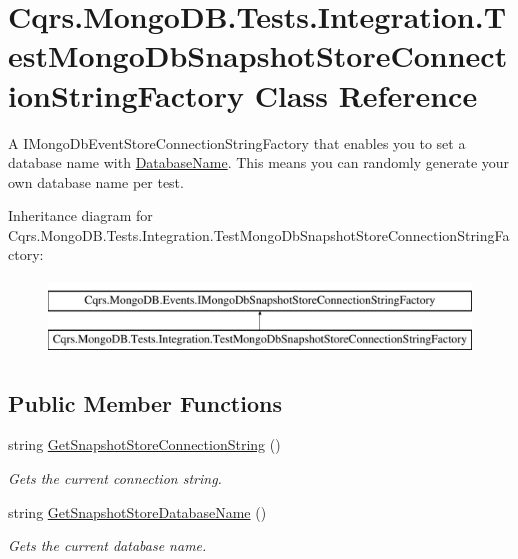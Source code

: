 \hypertarget{classCqrs_1_1MongoDB_1_1Tests_1_1Integration_1_1TestMongoDbSnapshotStoreConnectionStringFactory}{}\section{Cqrs.\+Mongo\+D\+B.\+Tests.\+Integration.\+Test\+Mongo\+Db\+Snapshot\+Store\+Connection\+String\+Factory Class Reference}
\label{classCqrs_1_1MongoDB_1_1Tests_1_1Integration_1_1TestMongoDbSnapshotStoreConnectionStringFactory}


A I\+Mongo\+Db\+Event\+Store\+Connection\+String\+Factory that enables you to set a database name with \hyperlink{classCqrs_1_1MongoDB_1_1Tests_1_1Integration_1_1TestMongoDbSnapshotStoreConnectionStringFactory_a7c9e2a69f78de292d276cca3ee740394_a7c9e2a69f78de292d276cca3ee740394}{Database\+Name}. This means you can randomly generate your own database name per test.  


Inheritance diagram for Cqrs.\+Mongo\+D\+B.\+Tests.\+Integration.\+Test\+Mongo\+Db\+Snapshot\+Store\+Connection\+String\+Factory\+:\begin{figure}[H]
\begin{center}
\leavevmode
\includegraphics[height=2.000000cm]{classCqrs_1_1MongoDB_1_1Tests_1_1Integration_1_1TestMongoDbSnapshotStoreConnectionStringFactory}
\end{center}
\end{figure}
\subsection*{Public Member Functions}
\begin{DoxyCompactItemize}
\item 
string \hyperlink{classCqrs_1_1MongoDB_1_1Tests_1_1Integration_1_1TestMongoDbSnapshotStoreConnectionStringFactory_ab75d7becd2ca0feb70315778cfa63b9c_ab75d7becd2ca0feb70315778cfa63b9c}{Get\+Snapshot\+Store\+Connection\+String} ()
\begin{DoxyCompactList}\small\item\em Gets the current connection string. \end{DoxyCompactList}\item 
string \hyperlink{classCqrs_1_1MongoDB_1_1Tests_1_1Integration_1_1TestMongoDbSnapshotStoreConnectionStringFactory_aec64598d970898309a086123b7867ab3_aec64598d970898309a086123b7867ab3}{Get\+Snapshot\+Store\+Database\+Name} ()
\begin{DoxyCompactList}\small\item\em Gets the current database name. \end{DoxyCompactList}\end{DoxyCompactItemize}
